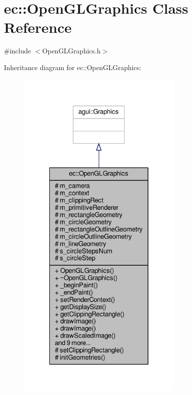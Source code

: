 \hypertarget{classec_1_1_open_g_l_graphics}{}\section{ec\+:\+:Open\+G\+L\+Graphics Class Reference}
\label{classec_1_1_open_g_l_graphics}


{\ttfamily \#include $<$Open\+G\+L\+Graphics.\+h$>$}



Inheritance diagram for ec\+:\+:Open\+G\+L\+Graphics\+:\nopagebreak
\begin{figure}[H]
\begin{center}
\leavevmode
\includegraphics[width=232pt]{classec_1_1_open_g_l_graphics__inherit__graph}
\end{center}
\end{figure}


